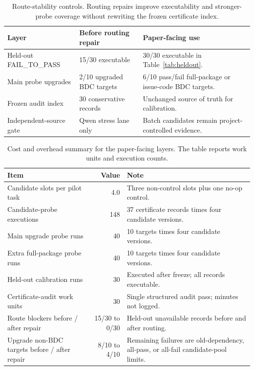 \documentclass[conference]{IEEEtran}
\begin{document}
\begin{table}[t]
\caption{Route-stability controls. Routing repairs improve executability and stronger-probe coverage without rewriting the frozen certificate index.}
\label{tab:route-stability}
\centering
\footnotesize
\begin{tabularx}{\columnwidth}{XXX}
\toprule
Layer & Before routing repair & Paper-facing use \\
\midrule
Held-out FAIL\_TO\_PASS & 15/30 executable & 30/30 executable in Table~\ref{tab:heldout}. \\
Main probe upgrades & 2/10 upgraded BDC targets & 6/10 pass/fail full-package or issue-code BDC targets. \\
Frozen audit index & 30 conservative records & Unchanged source of truth for calibration. \\
Independent-source gate & Qwen stress lane only & Batch candidates remain project-controlled evidence. \\
\bottomrule
\end{tabularx}
\end{table}

\begin{table}[t]
\caption{Cost and overhead summary for the paper-facing layers. The table reports work units and execution counts.}
\label{tab:overhead}
\centering
\scriptsize
\begin{tabularx}{\columnwidth}{XrX}
\toprule
Item & Value & Note \\
\midrule
Candidate slots per pilot task & 4.0 & Three non-control slots plus one no-op control. \\
Candidate-probe executions & 148 & 37 certificate records times four candidate versions. \\
Main upgrade probe runs & 40 & 10 targets times four candidate versions. \\
Extra full-package probe runs & 40 & 10 targets times four candidate versions. \\
Held-out calibration runs & 30 & Executed after freeze; all records executable. \\
Certificate-audit work units & 30 & Single structured audit pass; minutes not logged. \\
Route blockers before / after repair & 15/30 to 0/30 & Held-out unavailable records before and after routing. \\
Upgrade non-BDC targets before / after repair & 8/10 to 4/10 & Remaining failures are old-dependency, all-pass, or all-fail candidate-pool limits. \\
\bottomrule
\end{tabularx}
\end{table}
\end{document}
